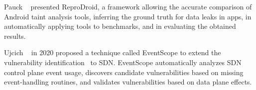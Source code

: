 Pauck \etal~\cite{10.1145/3236024.3236029} presented ReproDroid, a framework
allowing the accurate comparison of Android taint analysis tools, inferring the
ground truth for data leaks in apps, in automatically applying tools to
benchmarks, and in evaluating the obtained results.

Ujcich \etal~\cite{Ujcich+etal:2020:EventScope} in 2020 proposed a technique
called EventScope to extend the vulnerability identification~\cite{6994333} to
SDN. EventScope automatically analyzes SDN control plane event usage, discovers
candidate vulnerabilities based on missing event-handling routines, and
validates vulnerabilities based on data plane effects.

